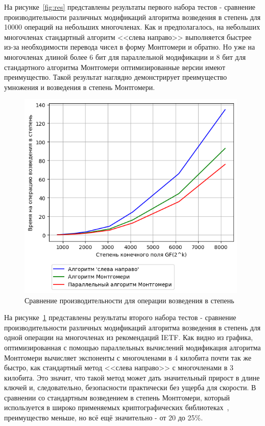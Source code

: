 \documentclass[times,specification,annotation]{itmo-student-thesis}
\begin{document}
На рисунке~\ref{fig:res} представлены результаты первого набора тестов - сравнение производительности различных
модификаций алгоритма возведения в степень для 10000 операций на небольших многочленах.
Как и предполагалось, на небольших многочленах стандартный алгоритм <<слева направо>> выполняется быстрее из-за
необходимости перевода чисел в форму Монтгомери и обратно.
Но уже на многочленах длиной более 6 бит для параллельной модификации и 8 бит для стандартного алгоритма Монтгомери
оптимизированные версии имеют преимущество.
Такой результат наглядно демонстрирует преимущество умножения и возведения в степень Монтгомери.

\begin{figure}[h]
\caption{Сравнение производительности для операции возведения в степень}\label{fig:res_bignum}
\includegraphics[width=11cm]{graphics/results_bignum_ru.png}
\end{figure}

На рисунке~\ref{fig:res_bignum} представлены результаты второго набора тестов - сравнение производительности различных
модификаций алгоритма возведения в степень для одной операции на многочленах из рекомендаций IETF.
Как видно из графика, оптимизированная с помощью параллельных вычислений модификация алгоритма Монтгомери
вычисляет экспоненты с многочленами в 4 килобита почти так же быстро, как стандартный метод <<слева направо>> с
многочленами в 3 килобита.
Это значит, что такой метод может дать значительный прирост в длине ключей и, следовательно, безопасности практически
без ущерба для скорости.
В сравнении со стандартным возведением в степень Монтгомери, который используется в широко применяемых
криптографических библиотеках~\cite{openssl}, преимущество меньше, но всё ещё значительно - от 20 до 25\%.
\end{document}
